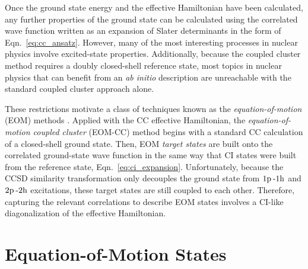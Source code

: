\documentclass[thesis.tex]{subfiles}
\begin{document}
Once the ground state energy and the effective Hamiltonian have been calculated, any further properties of the ground state can be calculated using the correlated wave function written as an expansion of Slater determinants in the form of Eqn.\ \eqref{eq:cc_ansatz}.  However, many of the most interesting processes in nuclear physics involve excited-state properties.  Additionally, because the coupled cluster method requires a doubly closed-shell reference state, most topics in nuclear physics that can benefit from an \emph{ab initio} description are unreachable with the standard coupled cluster approach alone.

These restrictions motivate a class of techniques known as the \textit{equation-of-motion} (EOM) methods \cite{ROWE1968}.  Applied with the CC effective Hamiltonian, the \textit{equation-of-motion coupled cluster} (EOM-CC) method begins with a standard CC calculation of a closed-shell ground state.  Then, EOM \textit{target states} are built onto the correlated ground-state wave function in the same way that CI states were built from the reference state, Eqn.\ \eqref{eq:ci_expansion}.  Unfortunately, because the CCSD similarity transformation only decouples the ground state from $1\mathrm{p}\hspace{2pt}\text{-}1\mathrm{h}$ and $2\mathrm{p}\hspace{2pt}\text{-}2\mathrm{h}$ excitations, these target states are still coupled to each other.  Therefore, capturing the relevant correlations to describe EOM states involves a CI-like diagonalization of the effective Hamiltonian.


\section{Equation-of-Motion States} \label{section:eom_target_states}
\end{document}
